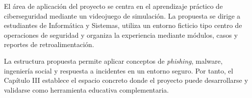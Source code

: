 El \'{a}rea de aplicaci\'{o}n del proyecto se centra en el aprendizaje pr\'{a}ctico de ciberseguridad mediante un videojuego de simulaci\'{o}n. La propuesta se dirige a estudiantes de Inform\'{a}tica y Sistemas, utiliza un entorno ficticio tipo centro de operaciones de seguridad y organiza la experiencia mediante m\'{o}dulos, casos y reportes de retroalimentaci\'{o}n.

La estructura propuesta permite aplicar conceptos de \textit{phishing}, malware, ingenier\'{i}a social y respuesta a incidentes en un entorno seguro. Por tanto, el Cap\'{i}tulo III establece el espacio concreto donde el proyecto puede desarrollarse y validarse como herramienta educativa complementaria.
